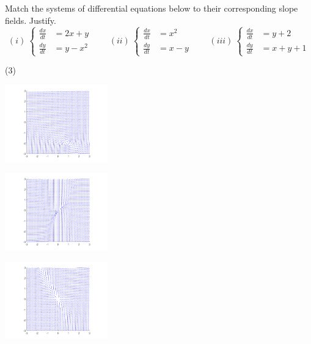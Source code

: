 \begin{exercise}
Match the systems of differential equations below to their corresponding slope fields. Justify.
\begin{equation*}
(i)\ \begin{cases} \frac{dx}{dt} &= 2x+y \\ \frac{dy}{dt} &= y - x^2 \end{cases} \qquad (ii)\ \begin{cases} \frac{dx}{dt} &= x^2 \\ \frac{dy}{dt} &= x-y \end{cases} \qquad (iii)\ \begin{cases} \frac{dx}{dt} &= y+2 \\ \frac{dy}{dt} &= x+y+1 \end{cases}
\end{equation*}
\begin{tasks}(3)
\task
\parbox[c]{2in}{\includegraphics[width=1.75in]{Images/sysslopeEx2_3}}
\task
\parbox[c]{2in}{\includegraphics[width=1.75in]{Images/sysslopeEx2_2}}
\task
\parbox[c]{2in}{\includegraphics[width=1.75in]{Images/sysslopeEx2_1}}
\end{tasks}
\end{exercise}


\setcounter{exercise}{100}


